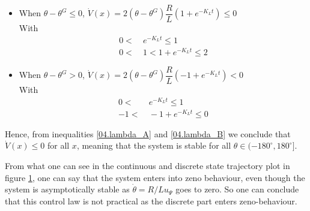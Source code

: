\begin{itemize}
  \item When $\theta - \theta^G \leq 0$, $\dot{V}(x) = 2 (\theta - \theta^G) \dfrac{R}{L} (1 + e^{-K_L t}) \leq 0$ \\
    With
    \begin{align}
      0 <&\ e^{-K_L t} \leq 1 \nonumber \\
      0 <&\ 1 < 1 + e^{-K_L t} \leq 2 \label{04.lambda_A}
    \end{align}
  \item When $\theta - \theta^G > 0$, $\dot{V}(x) = 2 (\theta - \theta^G) \dfrac{R}{L} (-1 + e^{-K_L t}) < 0$  \\
    With
    \begin{align}
      0 <&\ e^{-K_L t} \leq 1 \nonumber \\
      -1 <&\ -1 + e^{-K_L t} \leq 0 \label{04.lambda_B}
    \end{align}
\end{itemize}


Hence, from inequalities \ref{04.lambda_A} and \ref{04.lambda_B} we conclude
that $\dot{V}(x) \leq 0$ for all $x$, meaning that the system is stable for all
$\theta \in (-180^{\circ}, 180^{\circ}]$.

From what one can see in the continuous and discrete state trajectory plot in
figure \ref{fig:04}, one can say that the system enters into zeno behaviour,
even though the system is asymptotically stable as $\dot{\theta}=R /Lu_\Psi$
goes to zero. So one can conclude that this control law is not practical as
the discrete part enters zeno-behaviour.

\begin{figure}[H]\centering
  \scalebox{0.9}{}
  \caption{}
  \label{fig:04}
\end{figure}
